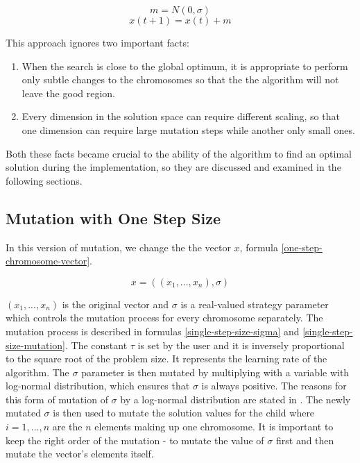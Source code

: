 \begin{equation}
    m = N(0, \sigma)
\end{equation}
\begin{equation} \label{simple-mutation}
    x(t+1) = x(t) + m
\end{equation}

This approach ignores two important facts:
\begin{enumerate}
    \item When the search is close to the global optimum, it is appropriate to perform only subtle changes to the chromosomes so that the the algorithm will not leave the good region.
    \item Every dimension in the solution space can require different scaling, so that one dimension can require large mutation steps while another only small ones.
\end{enumerate}

Both these facts became crucial to the ability of the algorithm to find an optimal solution during the implementation, so they are discussed and examined in the following sections.

\subsection{Mutation with One Step Size}
In this version of mutation, we change the the vector $x$, formula \ref{one-step-chromosome-vector}.

\begin{equation} \label{one-step-chromosome-vector}
x = ((x_1,...,x_n),\sigma)
\end{equation}

 $(x_1,...,x_n)$ is the original vector and $\sigma$ is a real-valued strategy parameter which controls the mutation process for every chromosome separately. The mutation process is described in formulas \ref{single-step-size-sigma} and \ref{single-step-size-mutation}. The constant $\tau$ is set by the user and it is inversely proportional to the square root of the problem size. It represents the learning rate of the algorithm. The $\sigma$ parameter is then mutated by multiplying with a variable with log-normal distribution, which ensures that $\sigma$ is always positive. The reasons for this form of mutation of $\sigma$ by a log-normal distribution are stated in \cite{x}. The newly mutated $\sigma$ is then used to mutate the solution values for the child where $i = 1,...,n$ are the $n$ elements making up one chromosome. It is important to keep the right order of the mutation - to mutate the value of $\sigma$ first and then mutate the vector's elements itself.

